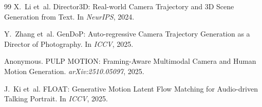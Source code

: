 \documentclass[10pt,twocolumn,letterpaper]{article}
\begin{document}
{\begin{thebibliography}{99}
X.~Li et~al.
\newblock Director3D: Real-world Camera Trajectory and 3D Scene Generation from Text.
\newblock In \emph{NeurIPS}, 2024.

Y.~Zhang et~al.
\newblock GenDoP: Auto-regressive Camera Trajectory Generation as a Director of Photography.
\newblock In \emph{ICCV}, 2025.

Anonymous.
\newblock PULP MOTION: Framing-Aware Multimodal Camera and Human Motion Generation.
\newblock \emph{arXiv:2510.05097}, 2025.

J.~Ki et~al.
\newblock FLOAT: Generative Motion Latent Flow Matching for Audio-driven Talking Portrait.
\newblock In \emph{ICCV}, 2025.

\end{thebibliography}
}
\end{document}
